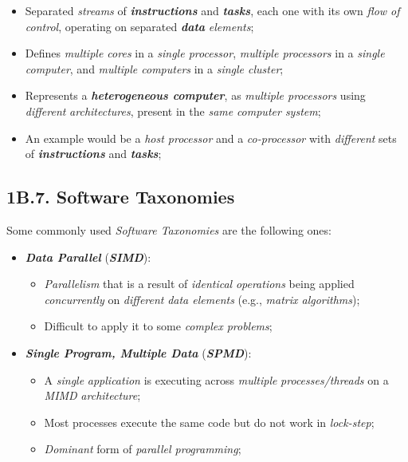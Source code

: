 \begin{itemize}
\begin{itemize}
        \item Separated \emph{streams} of \textbf{\emph{instructions}} and \textbf{\emph{tasks}}, each one with its own \emph{flow of control}, operating on separated \textbf{\emph{data}} \emph{elements};
        \item Defines \emph{multiple cores} in a \emph{single processor}, \emph{multiple processors} in a \emph{single computer}, and \emph{multiple computers} in a \emph{single cluster};
        \item Represents a \textbf{\emph{heterogeneous computer}}, as \emph{multiple processors} using \emph{different} \emph{architectures}, present in the \emph{same} \emph{computer system};
        \item An example would be a \emph{host processor} and a \emph{co-processor} with \emph{different} sets of \textbf{\emph{instructions}} and \textbf{\emph{tasks}};
    \end{itemize}
\end{itemize}

\newpage

\subsection*{\large{\textbf{1B.7. Software Taxonomies}}}
\label{ssec:lecture-1B7}

\noindent Some commonly used \emph{Software Taxonomies} are the following ones:
\begin{itemize}
    \vspace{-0.2cm}
    \item \textbf{\emph{Data Parallel}} (\textbf{\emph{SIMD}}):
    \vspace{-0.2cm}
    \begin{itemize}
        \item \emph{Parallelism} that is a result of \emph{identical} \emph{operations} being applied \emph{concurrently} on \emph{different} \emph{data elements} (e.g., \emph{matrix algorithms});
        \item Difficult to apply it to some \emph{complex problems};
    \end{itemize}
    \vspace{-0.2cm}
    \item \textbf{\emph{Single Program, Multiple Data}} (\textbf{\emph{SPMD}}):
    \vspace{-0.2cm}
    \begin{itemize}
        \item A \emph{single} \emph{application} is executing across \emph{multiple} \emph{processes/threads} on a \emph{MIMD} \emph{architecture};
        \item Most processes execute the same code but do not work in \emph{lock-step};
        \item \emph{Dominant} form of \emph{parallel programming};
    \end{itemize}
\end{itemize}

